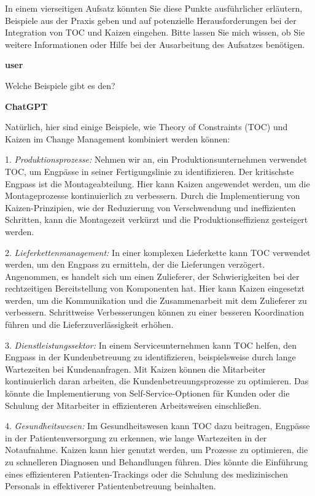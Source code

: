In einem vierseitigen Aufsatz könnten Sie diese Punkte ausführlicher erläutern, Beispiele aus der Praxis geben und auf potenzielle Herausforderungen bei der Integration von TOC und Kaizen eingehen. Bitte lassen Sie mich wissen, ob Sie weitere Informationen oder Hilfe bei der Ausarbeitung des Aufsatzes benötigen.

\textbf{user}

Welche Beispiele gibt es den? 

\textbf{ChatGPT}

Natürlich, hier sind einige Beispiele, wie Theory of Constraints (TOC) und Kaizen im Change Management kombiniert werden können:

1. \textit{Produktionsprozesse:} Nehmen wir an, ein Produktionsunternehmen verwendet TOC, um Engpässe in seiner Fertigungslinie zu identifizieren. Der kritischste Engpass ist die Montageabteilung. Hier kann Kaizen angewendet werden, um die Montageprozesse kontinuierlich zu verbessern. Durch die Implementierung von Kaizen-Prinzipien, wie der Reduzierung von Verschwendung und ineffizienten Schritten, kann die Montagezeit verkürzt und die Produktionseffizienz gesteigert werden.

2.\textit{ Lieferkettenmanagement:} In einer komplexen Lieferkette kann TOC verwendet werden, um den Engpass zu ermitteln, der die Lieferungen verzögert. Angenommen, es handelt sich um einen Zulieferer, der Schwierigkeiten bei der rechtzeitigen Bereitstellung von Komponenten hat. Hier kann Kaizen eingesetzt werden, um die Kommunikation und die Zusammenarbeit mit dem Zulieferer zu verbessern. Schrittweise Verbesserungen können zu einer besseren Koordination führen und die Lieferzuverlässigkeit erhöhen.

3. \textit{Dienstleistungssektor:} In einem Serviceunternehmen kann TOC helfen, den Engpass in der Kundenbetreuung zu identifizieren, beispielsweise durch lange Wartezeiten bei Kundenanfragen. Mit Kaizen können die Mitarbeiter kontinuierlich daran arbeiten, die Kundenbetreuungsprozesse zu optimieren. Das könnte die Implementierung von Self-Service-Optionen für Kunden oder die Schulung der Mitarbeiter in effizienteren Arbeitsweisen einschließen.

4. \textit{Gesundheitswesen:} Im Gesundheitswesen kann TOC dazu beitragen, Engpässe in der Patientenversorgung zu erkennen, wie lange Wartezeiten in der Notaufnahme. Kaizen kann hier genutzt werden, um Prozesse zu optimieren, die zu schnelleren Diagnosen und Behandlungen führen. Dies könnte die Einführung eines effizienteren Patienten-Trackings oder die Schulung des medizinischen Personals in effektiverer Patientenbetreuung beinhalten.

